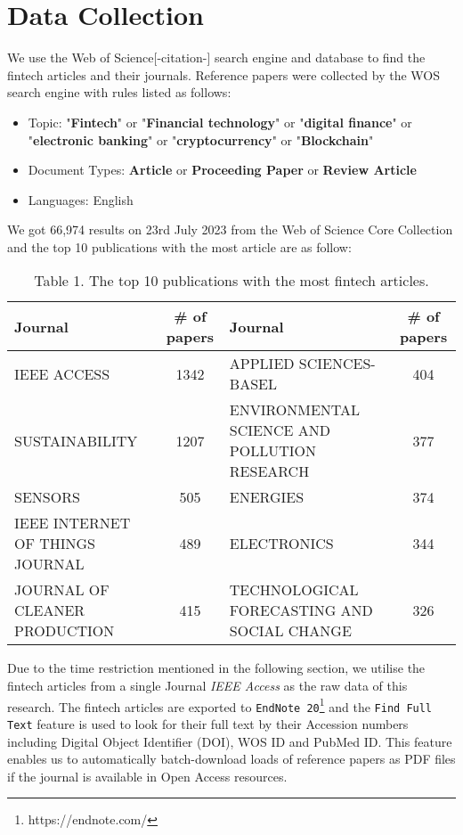 \section{Data Collection}
We use the Web of Science[-citation-] search engine and database to find the fintech articles and their journals.
Reference papers were collected by the WOS search engine with rules listed as follows:
\begin{itemize}
    \item Topic: "\textbf{Fintech}" or "\textbf{Financial technology}" or "\textbf{digital finance}" or "\textbf{electronic banking}" or "\textbf{cryptocurrency}" or "\textbf{Blockchain}"
    \item Document Types: \textbf{Article} or \textbf{Proceeding Paper} or \textbf{Review Article}
    \item Languages: English
\end{itemize}

We got 66,974 results on 23rd July 2023 from the Web of Science Core Collection and the top 10 publications with the most article are as follow:
\begin{table}[]
\caption{Table 1. The top 10 publications with the most fintech articles.}
\centering
    \begin{tabular}{|lc|lc|}
    \hline
    Journal                         & \# of papers & Journal                                      & \# of papers \\ \hline
    IEEE ACCESS                     & 1342         & APPLIED SCIENCES-BASEL                       & 404          \\
    SUSTAINABILITY                  & 1207         & ENVIRONMENTAL SCIENCE AND POLLUTION RESEARCH & 377          \\
    SENSORS                         & 505          & ENERGIES                                     & 374          \\
    IEEE INTERNET OF THINGS JOURNAL & 489          & ELECTRONICS                                  & 344          \\
    JOURNAL OF CLEANER PRODUCTION   & 415          & TECHNOLOGICAL FORECASTING AND SOCIAL CHANGE  & 326          \\ \hline
    \end{tabular}
    \end{table}

Due to the time restriction mentioned in the following section, we utilise the fintech articles from a single Journal \textit{IEEE Access} as the raw data of this research.
The fintech articles are exported to \texttt{EndNote 20}\footnote{https://endnote.com/} and the \texttt{Find Full Text} feature is used to look for their full text by their Accession numbers including Digital Object Identifier (DOI), WOS ID and PubMed ID.
This feature enables us to automatically batch-download loads of reference papers as PDF files if the journal is available in Open Access resources.

